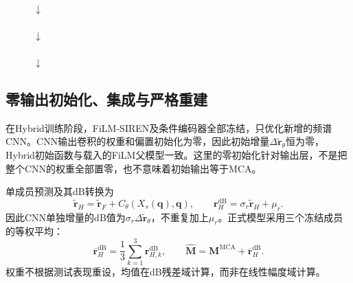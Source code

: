 \begin{figure}[htbp]
\centering
\small
{}
\\[3pt]$\downarrow$\\[3pt]
\\[3pt]$\downarrow$\\[3pt]
\\[3pt]$\downarrow$\\[3pt]
\end{figure}

\subsection{零输出初始化、集成与严格重建}
在Hybrid训练阶段，FiLM-SIREN及条件编码器全部冻结，只优化新增的频谱CNN。CNN输出卷积的权重和偏置初始化为零，因此初始增量$\Delta\widetilde{\mathbf r}_\theta$恒为零，Hybrid初始函数与载入的FiLM父模型一致。这里的零初始化针对输出层，不是把整个CNN的权重全部置零，也不意味着初始输出等于MCA。

单成员预测及其dB转换为
\begin{equation}
\widetilde{\mathbf r}_H=\widetilde{\mathbf r}_F+
C_\theta(X_s(\mathbf q),\mathbf q),\qquad
\mathbf r_H^{\mathrm{dB}}=\sigma_r\widetilde{\mathbf r}_H+\mu_r.
\end{equation}
因此CNN单独增量的dB值为$\sigma_r\Delta\widetilde{\mathbf r}_\theta$，不重复加上$\mu_r$。正式模型采用三个冻结成员的等权平均：
\begin{equation}
\overline{\mathbf r}_H^{\mathrm{dB}}=\frac{1}{3}
\sum_{k=1}^{3}\mathbf r_{H,k}^{\mathrm{dB}},\qquad
\widehat{\mathbf M}=\mathbf M^{\mathrm{MCA}}+
\overline{\mathbf r}_H^{\mathrm{dB}}.
\label{eq:ensemble}
\end{equation}
权重不根据测试表现重设，均值在dB残差域计算，而非在线性幅度域计算。

